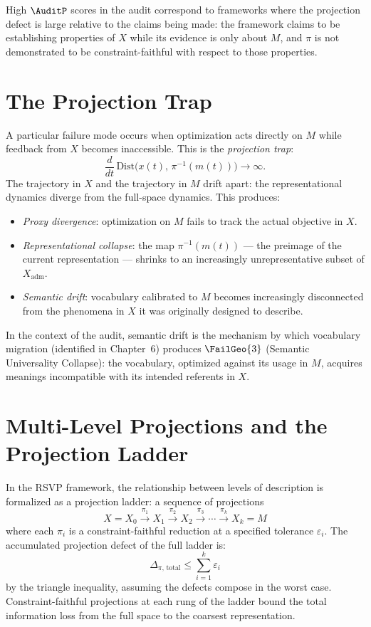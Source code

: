 High $\AuditP$ scores in the \Ortyx{} audit correspond
to frameworks where the projection defect is large relative
to the claims being made: the framework claims to be
establishing properties of $X$ while its evidence is
only about $M$, and $\pi$ is not demonstrated to be
constraint-faithful with respect to those properties.

\section{The Projection Trap}
\label{app-a:projection-trap}

A particular failure mode occurs when optimization
acts directly on $M$ while feedback from $X$ becomes
inaccessible. This is the \emph{projection trap}:
\[
  \frac{d}{dt}\,\mathrm{Dist}\!\bigl(x(t),\,
  \pi^{-1}(m(t))\bigr) \to \infty.
\]
The trajectory in $X$ and the trajectory in $M$ drift apart:
the representational dynamics diverge from the full-space
dynamics. This produces:

\begin{itemize}
  \item \textit{Proxy divergence}: optimization on $M$
  fails to track the actual objective in $X$.
  \item \textit{Representational collapse}: the map
  $\pi^{-1}(m(t))$ --- the preimage of the current
  representation --- shrinks to an increasingly unrepresentative
  subset of $X_{\mathrm{adm}}$.
  \item \textit{Semantic drift}: vocabulary calibrated
  to $M$ becomes increasingly disconnected from the
  phenomena in $X$ it was originally designed to describe.
\end{itemize}

In the context of the \Ortyx{} audit, semantic drift is
the mechanism by which vocabulary migration (identified
in Chapter~6) produces $\FailGeo{3}$ (Semantic Universality
Collapse): the vocabulary, optimized against its usage
in $M$, acquires meanings incompatible with its intended
referents in $X$.

\section{Multi-Level Projections and the Projection Ladder}
\label{app-a:projection-ladder}

In the RSVP framework, the relationship between levels
of description is formalized as a projection ladder:
a sequence of projections
\[
  X = X_0 \xrightarrow{\pi_1} X_1
  \xrightarrow{\pi_2} X_2 \xrightarrow{\pi_3}
  \cdots \xrightarrow{\pi_k} X_k = M
\]
where each $\pi_i$ is a constraint-faithful reduction
at a specified tolerance $\varepsilon_i$. The accumulated
projection defect of the full ladder is:
\[
  \Delta_{\pi,\,\mathrm{total}} \le \sum_{i=1}^{k} \varepsilon_i
\]
by the triangle inequality, assuming the defects compose
in the worst case. Constraint-faithful projections at
each rung of the ladder bound the total information
loss from the full space to the coarsest representation.

